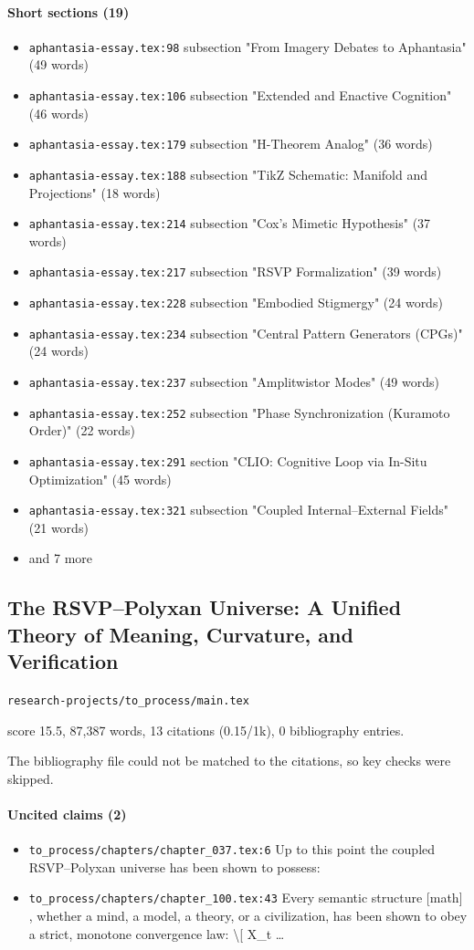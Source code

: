 \documentclass[11pt]{article}
\newcommand{\loc}[1]{{\small\color{muted}\texttt{#1}}}
\begin{document}
\paragraph{Short sections (19)}
\begin{itemize}
\item \loc{aphantasia-essay.tex:98} subsection "From Imagery Debates to Aphantasia" (49 words)
\item \loc{aphantasia-essay.tex:106} subsection "Extended and Enactive Cognition" (46 words)
\item \loc{aphantasia-essay.tex:179} subsection "H-Theorem Analog" (36 words)
\item \loc{aphantasia-essay.tex:188} subsection "TikZ Schematic: Manifold and Projections" (18 words)
\item \loc{aphantasia-essay.tex:214} subsection "Cox's Mimetic Hypothesis" (37 words)
\item \loc{aphantasia-essay.tex:217} subsection "RSVP Formalization" (39 words)
\item \loc{aphantasia-essay.tex:228} subsection "Embodied Stigmergy" (24 words)
\item \loc{aphantasia-essay.tex:234} subsection "Central Pattern Generators (CPGs)" (24 words)
\item \loc{aphantasia-essay.tex:237} subsection "Amplitwistor Modes" (49 words)
\item \loc{aphantasia-essay.tex:252} subsection "Phase Synchronization (Kuramoto Order)" (22 words)
\item \loc{aphantasia-essay.tex:291} section "CLIO: Cognitive Loop via In-Situ Optimization" (45 words)
\item \loc{aphantasia-essay.tex:321} subsection "Coupled Internal--External Fields" (21 words)
\item[] {\color{muted}\small and 7 more}
\end{itemize}
\subsection{The RSVP--Polyxan Universe: A Unified Theory of Meaning, Curvature, and Verification}
\loc{research-projects/\allowbreak{}to\_process/\allowbreak{}main.tex}\par
score 15.5, 87,387 words, 13 citations (0.15/1k), 0 bibliography entries.

The bibliography file could not be matched to the citations, so key checks were skipped.

\paragraph{Uncited claims (2)}
\begin{itemize}
\item \loc{to\_process/\allowbreak{}chapters/\allowbreak{}chapter\_037.tex:6} Up to this point the coupled RSVP--Polyxan universe has been shown to possess:
\item \loc{to\_process/\allowbreak{}chapters/\allowbreak{}chapter\_100.tex:43} Every semantic structure [math] , whether a mind, a model, a theory, or a civilization, has been shown to obey a strict, monotone convergence law: \textbackslash{}[ X\_t \ldots{}
\end{itemize}
\end{document}

